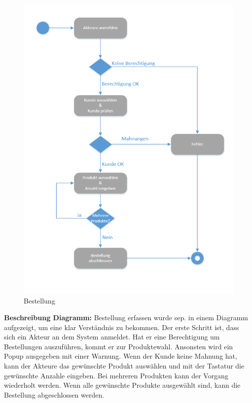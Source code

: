 \begin{figure}[H]
\centering
	\includegraphics[width=0.7\linewidth]{Images/Bestellung}
	\caption{Bestellung}
	\label{fig:kontextdiagram}
\end{figure}
\textbf{Beschreibung Diagramm:}
Bestellung erfassen wurde sep. in einem Diagramm aufgezeigt, um eine klar Verständnis zu bekommen. Der erste Schritt ist, dass sich ein Akteur an dem System anmeldet. Hat er eine Berechtigung um Bestellungen auszuführen, kommt er zur Produktewahl. Ansonsten wird ein Popup ausgegeben mit einer Warnung. 
Wenn der Kunde keine Mahnung hat, kann der Akteure das gewünschte Produkt auswählen und mit der Tastatur die gewünschte Anzahle eingeben. Bei mehreren Produkten kann der Vorgang wiederholt werden. Wenn alle gewünschte Produkte ausgewählt sind, kann die Bestellung abgeschlossen werden.










